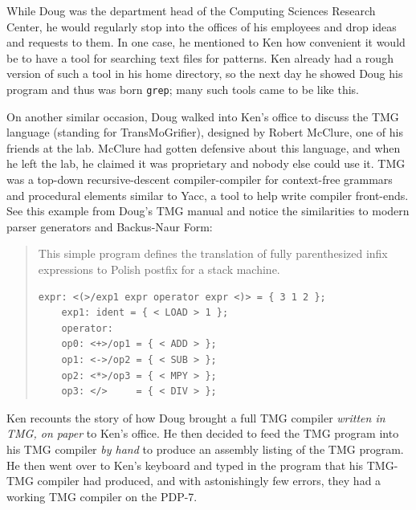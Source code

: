 While Doug was the department head of the Computing Sciences Research Center,
he would regularly stop into the offices of his employees and drop ideas and requests
to them. In one case, he mentioned to Ken how convenient it would be to have
a tool for searching text files for patterns.
Ken already had a rough version of such a tool in his home directory,
so the next day he showed Doug his program and thus was born \texttt{grep};
many such tools came to be like this.

On another similar occasion, Doug walked into Ken's office to discuss the TMG language
(standing for TransMoGrifier),
designed by Robert McClure\cite{mcclure_tmg_compiler_compiler_1965}, one of his friends at the lab.
McClure had gotten defensive about this language, and when he left the lab,
he claimed it was proprietary and nobody else could use it.
TMG was a top-down recursive-descent compiler-compiler for context-free grammars
and procedural elements similar to Yacc, a tool to help write compiler
front-ends.
See this example from Doug's TMG manual\cite{tmg_manual_mcilroy_1972}
and notice the similarities to modern parser generators and Backus-Naur Form:

\begin{quotation}
This simple program defines the translation of fully parenthesized infix 
expressions to Polish postfix for a stack machine.
\begin{lstlisting}[frame=single]
    expr: <(>/exp1 expr operator expr <)> = { 3 1 2 };
    exp1: ident = { < LOAD > 1 };
    operator:
    op0: <+>/op1 = { < ADD > };
    op1: <->/op2 = { < SUB > };
    op2: <*>/op3 = { < MPY > };
    op3: </>     = { < DIV > };
\end{lstlisting}
\end{quotation}

Ken recounts\cite{kernighan_interviews_thompson_2019}
the story of how Doug brought a full TMG compiler \textit{written in TMG,
on paper} to Ken's office. He then decided to feed the TMG program into his TMG compiler
\textit{by hand} to produce an assembly listing of the TMG program.
He then went over to Ken's keyboard and typed in the program that his TMG-TMG compiler
had produced, and with astonishingly few errors, they had a working TMG compiler on the PDP-7.

